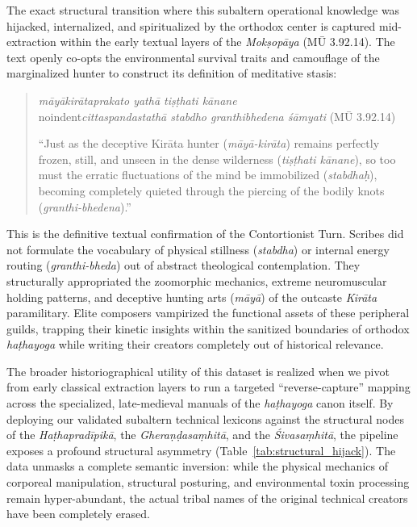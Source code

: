 \documentclass[11pt,twoside,letterpaper]{article}
\begin{document}
The exact structural transition where this subaltern operational knowledge was hijacked, internalized, and spiritualized by the orthodox center is captured mid-extraction within the early textual layers of the \textit{Mokṣopāya} (MŪ 3.92.14). The text openly co-opts the environmental survival traits and camouflage of the marginalized hunter to construct its definition of meditative stasis:

\begin{quote}
\small
\noindent\textit{māyākirātaprakato yathā tiṣṭhati kānane \vert} \\noindent\textit{cittaspandastathā stabdho granthibhedena śāmyati} (MŪ 3.92.14)
\medskip

``Just as the deceptive Kirāta hunter (\textit{māyā-kirāta}) remains perfectly frozen, still, and unseen in the dense wilderness (\textit{tiṣṭhati kānane}), so too must the erratic fluctuations of the mind be immobilized (\textit{stabdhaḥ}), becoming completely quieted through the piercing of the bodily knots (\textit{granthi-bhedena}).''
\end{quote}

This is the definitive textual confirmation of the Contortionist Turn. Scribes did not formulate the vocabulary of physical stillness (\textit{stabdha}) or internal energy routing (\textit{granthi-bheda}) out of abstract theological contemplation. They structurally appropriated the zoomorphic mechanics, extreme neuromuscular holding patterns, and deceptive hunting arts (\textit{māyā}) of the outcaste \textit{Kirāta} paramilitary. Elite composers vampirized the functional assets of these peripheral guilds, trapping their kinetic insights within the sanitized boundaries of orthodox \textit{haṭhayoga} while writing their creators completely out of historical relevance.

The broader historiographical utility of this dataset is realized when we pivot from early classical extraction layers to run a targeted ``reverse-capture'' mapping across the specialized, late-medieval manuals of the \textit{haṭhayoga} canon itself. By deploying our validated subaltern technical lexicons against the structural nodes of the \textit{Haṭhapradīpikā}, the \textit{Gheraṇḍasaṃhitā}, and the \textit{Śivasaṃhitā}, the pipeline exposes a profound structural asymmetry (Table~\ref{tab:structural_hijack}). The data unmasks a complete semantic inversion: while the physical mechanics of corporeal manipulation, structural posturing, and environmental toxin processing remain hyper-abundant, the actual tribal names of the original technical creators have been completely erased.
\end{document}
